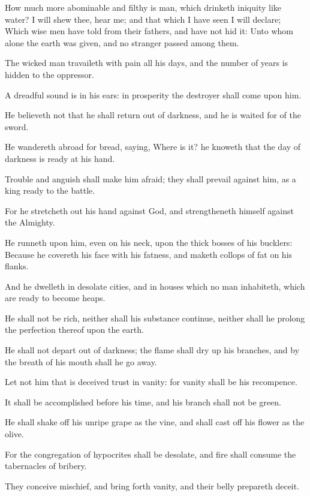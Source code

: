 \Verse How much more abominable and filthy is man, which drinketh iniquity like water?  \Verse I will shew thee, hear me; and that which I have seen I will declare; \Verse Which wise men have told from their fathers, and have not hid it: \Verse Unto whom alone the earth was given, and no stranger passed among them.

\Verse The wicked man travaileth with pain all his days, and the number of years is hidden to the oppressor.

\Verse A dreadful sound is in his ears: in prosperity the destroyer shall come upon him.

\Verse He believeth not that he shall return out of darkness, and he is waited for of the sword.

\Verse He wandereth abroad for bread, saying, Where is it? he knoweth that the day of darkness is ready at his hand.

\Verse Trouble and anguish shall make him afraid; they shall prevail against him, as a king ready to the battle.

\Verse For he stretcheth out his hand against God, and strengtheneth himself against the Almighty.

\Verse He runneth upon him, even on his neck, upon the thick bosses of his bucklers: \Verse Because he covereth his face with his fatness, and maketh collops of fat on his flanks.

\Verse And he dwelleth in desolate cities, and in houses which no man inhabiteth, which are ready to become heaps.

\Verse He shall not be rich, neither shall his substance continue, neither shall he prolong the perfection thereof upon the earth.

\Verse He shall not depart out of darkness; the flame shall dry up his branches, and by the breath of his mouth shall he go away.

\Verse Let not him that is deceived trust in vanity: for vanity shall be his recompence.

\Verse It shall be accomplished before his time, and his branch shall not be green.

\Verse He shall shake off his unripe grape as the vine, and shall cast off his flower as the olive.

\Verse For the congregation of hypocrites shall be desolate, and fire shall consume the tabernacles of bribery.

\Verse They conceive mischief, and bring forth vanity, and their belly prepareth deceit.


